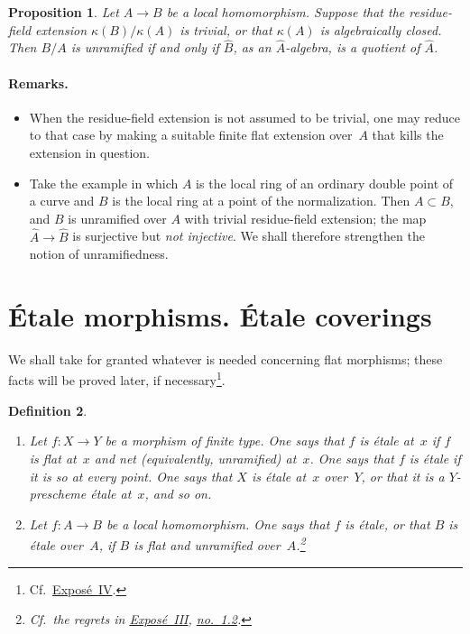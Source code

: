 \documentclass[11pt,oneside]{amsbook}
\newtheorem{proposition}{Proposition}[section]
\newtheorem{definition}[proposition]{Definition}
\theoremstyle{remark}
\theoremstyle{plain}
\numberwithin{equation}{section}
\begin{document}
\begin{proposition}
\label{I.3.7}
Let \(A\to B\) be a local homomorphism.  Suppose that the residue-field
extension \(\kappa(B)/\kappa(A)\) is trivial, or that \(\kappa(A)\) is
algebraically closed.  Then \(B/A\) is unramified if and only if
\(\widehat B\), as an \(\widehat A\)-algebra, is a quotient of
\(\widehat A\).
\end{proposition}

\paragraph{Remarks.}
\begin{itemize}
\item When the residue-field extension is not assumed to be trivial, one may
  reduce to that case by making a suitable finite flat extension over~\(A\)
  that kills the extension in question.
\item Take the example in which \(A\) is the local ring of an ordinary
  double point of a curve and \(B\) is the local ring at a point of the
  normalization.  Then \(A\subset B\), and \(B\) is unramified
  over \(A\) with
  trivial residue-field extension; the map
  \(\widehat A\to\widehat B\) is surjective but \emph{not injective}.
  We shall therefore strengthen the notion of unramifiedness.
\end{itemize}

\section{Étale morphisms. Étale coverings}
\label{I.4}

We shall take for granted whatever is needed concerning flat morphisms; these
facts will be proved later, if necessary\footnote{Cf.\
\hyperref[IV]{Expos\'e~IV}.}.

\begin{definition}
\label{I.4.1}
\begin{enumerate}
\item[(a)] Let \(f\colon X\to Y\) be a morphism of finite type.  One says
  that \(f\) is \emph{étale} at~\(x\) if \(f\) is flat at~\(x\) and net
  (equivalently, unramified) at~\(x\).  One says that \(f\) is étale if it
  is so at every point.  One says that \(X\) is étale at~\(x\) over~\(Y\),
  or that it is a \(Y\)-prescheme étale at~\(x\), and so on.
\item[(b)] Let \(f\colon A\to B\) be a local homomorphism.  One says that
  \(f\) is étale, or that \(B\) is étale over~\(A\), if \(B\) is flat and
  unramified over~\(A\).\footnote{Cf.\ the regrets in
  \hyperref[III]{Expos\'e~III},
  \hyperref[III.1.2]{no.~1.2}.}
\end{enumerate}
\end{definition}
\end{document}
